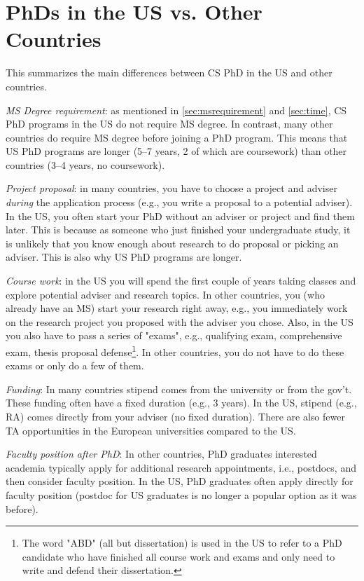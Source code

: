 \documentclass[oneside,11pt]{memoir}
\begin{document}
\section{PhDs in the US vs. Other Countries}\label{sec:non-us-differences}

This summarizes the main differences between CS PhD in the US and other countries. %

\emph{MS Degree requirement}:  as mentioned in \autoref{sec:msrequirement} and \autoref{sec:time}, CS PhD programs in the US do not require MS degree.  In contrast, many other countries do require MS degree before joining a PhD program.  This means that US PhD programs are longer (5--7 years, 2 of which are coursework) than other countries (3--4 years, no coursework).

\emph{Project proposal}: in many countries, you have to choose a project and adviser \emph{during} the application process (e.g., you write a proposal to a potential adviser). In the US, you often start your PhD without an adviser or project and find them later. This is because as someone who just finished your undergraduate study, it is unlikely that you know enough about research to do proposal or picking an adviser.  This is also why US PhD programs are longer.

\emph{Course work}: in the US you will spend the first couple of years taking classes and explore potential adviser and research topics. In other countries, you (who already have an MS) start your research right away, e.g., you immediately work on the research project you proposed with the adviser you chose. Also, in the US you also have to pass a series of "exams", e.g., qualifying exam, comprehensive exam, thesis proposal defense\footnote{The word "ABD" (all but dissertation) is used in the US to refer to a PhD candidate who have finished all course work and exams and only need to write and defend their dissertation.}. In other countries, you do not have to do these exams or only do a few of them.

\emph{Funding}:  In many countries stipend comes from the university or from the gov't. These funding often have a fixed duration (e.g., 3 years).  In the US, stipend (e.g., RA) comes directly from your adviser (no fixed duration).  There are also fewer TA opportunities in the European universities compared to the US.

\emph{Faculty position after PhD}: In other countries, PhD graduates interested academia typically apply for additional research appointments, i.e., postdocs, and then consider faculty position. In the US, PhD graduates often apply directly for faculty position (postdoc for US graduates is no longer a popular option as it was before).  %
\end{document}
